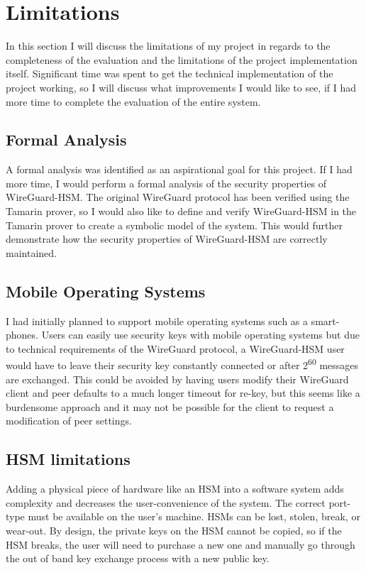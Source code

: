 \documentclass [11pt, proquest] {uwthesis}[2020/02/24]
\begin{document}
\section {Limitations}
In this section I will discuss the limitations of my project in regards to the completeness of the evaluation and the limitations of the project implementation itself. Significant time was spent to get the technical implementation of the project working, so I will discuss what improvements I would like to see, if I had more time to complete the evaluation of the entire system.

\subsection{Formal Analysis}
A formal analysis was identified as an aspirational goal for this project. If I had more time, I would perform a formal analysis of the security properties of WireGuard-HSM. The original WireGuard protocol has been verified using the Tamarin prover\cite{donenfeld_formal_2018}, so I would also like to define and verify WireGuard-HSM in the Tamarin prover to create a symbolic model of the system. This would further demonstrate how the security properties of WireGuard-HSM are correctly maintained.

\subsection{Mobile Operating Systems}
I had initially planned to support mobile operating systems such as a smart-phones. Users can easily use security keys with mobile operating systems but due to technical requirements of the WireGuard protocol, a WireGuard-HSM user would have to leave their security key constantly connected
or after 2\textsuperscript{60} messages are exchanged. This could be avoided by having users modify their WireGuard client and peer defaults to a much longer timeout for re-key, but this seems like a burdensome approach and it may not be possible for the client to request a modification of peer settings.

\subsection{HSM limitations}
Adding a physical piece of hardware like an HSM into a software system adds complexity and decreases the user-convenience of the system. The correct port-type must be available on the user's machine. HSMs can be lost, stolen, break, or wear-out. By design, the private keys on the HSM cannot be copied, so if the HSM breaks, the user will need to purchase a new one and manually go through the out of band key exchange process with a new public key.
\end{document}
